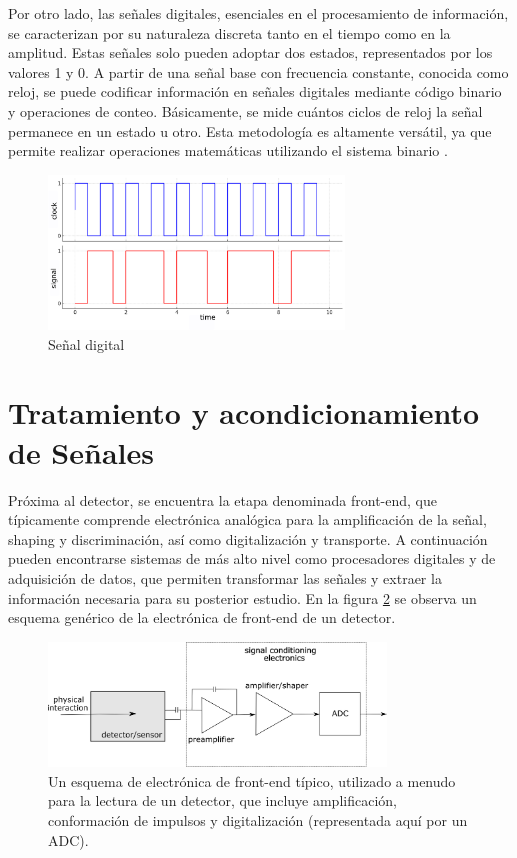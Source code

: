 \documentclass[]{book}
\begin{document}
\noindent Por otro lado, las señales digitales, esenciales en el procesamiento de información, se caracterizan por su naturaleza discreta tanto en el tiempo como en la amplitud. Estas señales solo pueden adoptar dos estados, representados por los valores 1 y 0. A partir de una señal base con frecuencia constante, conocida como reloj, se puede codificar información en señales digitales mediante código binario y operaciones de conteo. Básicamente, se mide cuántos ciclos de reloj la señal permanece en un estado u otro. Esta metodología es altamente versátil, ya que permite realizar operaciones matemáticas utilizando el sistema binario \cite{brown2000fundamentals}.

\begin{figure}[h]
    \centering
    \includegraphics[width=0.7\textwidth]{digital_signal.png}
    \caption{Señal digital}
    \label{fig:digital_siganl}

\end{figure}

\section{Tratamiento y acondicionamiento de Señales}

\noindent Próxima al detector, se encuentra la etapa denominada front-end, que típicamente comprende electrónica analógica para la amplificación de la señal, shaping y discriminación, así como digitalización y transporte. A continuación pueden encontrarse sistemas de más alto nivel como procesadores digitales y de adquisición de datos, que permiten transformar las señales y extraer la información necesaria para su posterior estudio. En la figura \ref{fig:generic_frontend} se observa un esquema genérico de la electrónica de front-end de un detector.\\

\begin{figure}[h]
    \centering
    \includegraphics[width=0.8\textwidth]{front-end.png}
    \caption{Un esquema de electrónica de front-end típico, utilizado a menudo para la lectura de un
    detector, que incluye amplificación, conformación de impulsos y digitalización (representada aquí por un ADC).}
    \label{fig:generic_frontend}

\end{figure}
\end{document}
